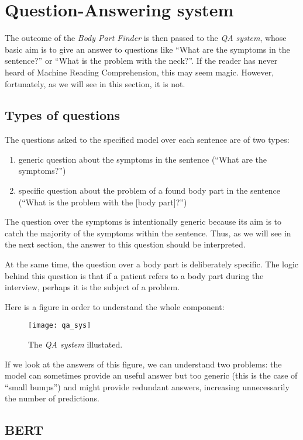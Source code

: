 \section{Question-Answering system}
\label{sec:qa_system}
The outcome of the \textit{Body Part Finder} is then passed to the \textit{QA system}, whose basic aim is to give an answer to questions like “What are the symptoms in the sentence?” or “What is the problem with the neck?”. If the reader has never heard of Machine Reading Comprehension, this may seem magic. However, fortunately, as we will see in this section, it is not.

\subsection{Types of questions}
The questions asked to the specified model over each sentence are of two types:
\begin{enumerate}
  \item generic question about the symptoms in the sentence (“What are the symptoms?”)
  \item specific question about the problem of a found body part in the sentence (“What is the problem with the [body part]?”)
\end{enumerate}

The question over the symptoms is intentionally generic because its aim is to catch the majority of the symptoms within the sentence. Thus, as we will see in the next section, the answer to this question should be interpreted.

At the same time, the question over a body part is deliberately specific. The logic behind this question is that if a patient refers to a body part during the interview, perhaps it is the subject of a problem.

Here is a figure in order to understand the whole component:

\begin{figure}[h]
\centering
\texttt{[image: qa\_sys]}
\caption{The \textit{QA system} illustated.}
\medskip
\end{figure}

If we look at the answers of this figure, we can understand two problems: the model can sometimes provide an useful answer but too generic (this is the case of ``small bumps'') and might provide redundant answers, increasing unnecessarily the number of predictions.

\subsection{BERT}



